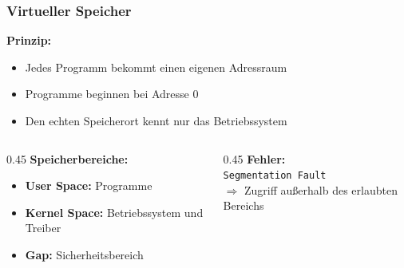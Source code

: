 \documentclass[aspectratio=169]{beamer}
\begin{document}
\begin{frame}
  \frametitle{Virtueller Speicher}
  \textbf{Prinzip:}
  \begin{itemize}
    \item Jedes Programm bekommt einen eigenen Adressraum
    \item Programme beginnen bei Adresse 0
    \item Den echten Speicherort kennt nur das Betriebssystem
  \end{itemize}
  \vspace{3mm}
  \begin{columns}[T]
    \begin{column}{0.45\textwidth}
      \textbf{Speicherbereiche:}
      \begin{itemize}
        \item \textbf{User Space:} Programme
        \item \textbf{Kernel Space:} Betriebssystem und Treiber
        \item \textbf{Gap:} Sicherheitsbereich
      \end{itemize}
    \end{column}
    \begin{column}{0.45\textwidth}
      \textbf{Fehler:}\\
      \texttt{Segmentation Fault}\\
      $\Rightarrow$ Zugriff außerhalb des erlaubten Bereichs
    \end{column}
  \end{columns}
\end{frame}
\end{document}
